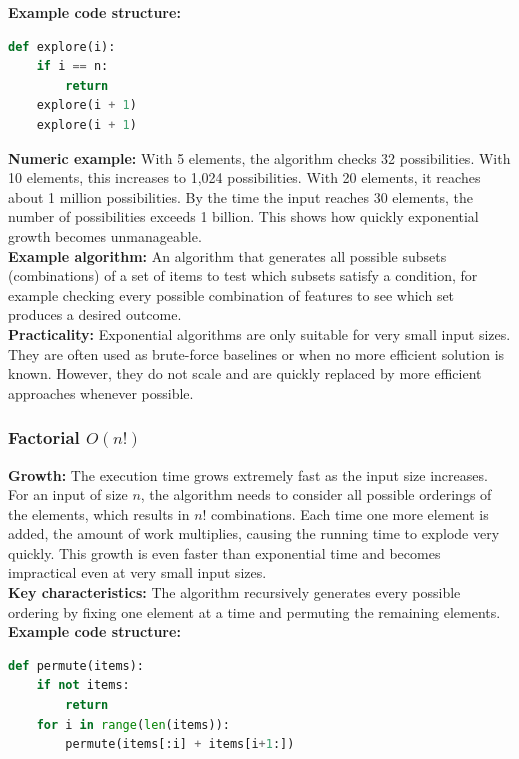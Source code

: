\documentclass[12pt]{article}
\begin{document}
\noindent\textbf{Example code structure:}
\begin{lstlisting}[language=Python]
def explore(i):
    if i == n:
        return
    explore(i + 1)
    explore(i + 1)
\end{lstlisting}

\noindent\textbf{Numeric example:}
With 5 elements, the algorithm checks 32 possibilities. With 10 elements, this increases to 1,024 possibilities. With 20 elements, it reaches about 1 million possibilities. By the time the input reaches 30 elements, the number of possibilities exceeds 1 billion. This shows how quickly exponential growth becomes unmanageable.\\

\noindent\textbf{Example algorithm:}
An algorithm that generates all possible subsets (combinations) of a set of items to test which subsets satisfy a condition, for example checking every possible combination of features to see which set produces a desired outcome.\\

\noindent\textbf{Practicality:}
Exponential algorithms are only suitable for very small input sizes. They are often used as brute-force baselines or when no more efficient solution is known. However, they do not scale and are quickly replaced by more efficient approaches whenever possible.

\subsubsection{Factorial $O(n!)$}

\noindent\textbf{Growth:}
The execution time grows extremely fast as the input size increases. For an input of size $n$, the algorithm needs to consider all possible orderings of the elements, which results in $n!$ combinations. Each time one more element is added, the amount of work multiplies, causing the running time to explode very quickly. This growth is even faster than exponential time and becomes impractical even at very
small input sizes.\\

\noindent\textbf{Key characteristics:}
The algorithm recursively generates every possible ordering by fixing one element
at a time and permuting the remaining elements.\\

\noindent\textbf{Example code structure:}
\begin{lstlisting}[language=Python]
def permute(items):
    if not items:
        return
    for i in range(len(items)):
        permute(items[:i] + items[i+1:])
\end{lstlisting}
\end{document}
